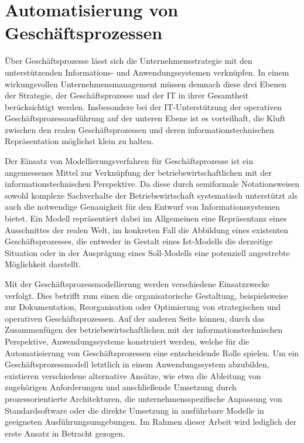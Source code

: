 \section{Automatisierung von Geschäftsprozessen}\label{sec:Automatisierung}
Über Geschäftsprozesse lässt sich die Unternehmensstrategie mit den unterstützenden Informations- und Anwendungssystemen verknüpfen.
In einem wirkungsvollen Unternehmensmanagement müssen demnach diese drei Ebenen der Strategie, der Geschäftsprozesse und der IT in ihrer Gesamtheit berücksichtigt werden.
Insbesondere bei der IT-Unterstützung der operativen Geschäftsprozessausführung auf der unteren Ebene ist es vorteilhaft, die Kluft zwischen den realen Geschäftsprozessen und deren informationstechnischen Repräsentation möglichst klein zu halten.

Der Einsatz von Modellierungsverfahren für Geschäftsprozesse ist ein angemessenes Mittel zur Verknüpfung der betriebswirtschaftlichen mit der informationstechnischen Perspektive.
Da diese durch semiformale Notationsweisen sowohl komplexe Sachverhalte der Betriebswirtschaft systematisch unterstützt als auch die notwendige Genauigkeit für den Entwurf von Informationssystemen bietet.
Ein Modell repräsentiert dabei im Allgemeinen eine Repräsentanz eines Ausschnittes der realen Welt, im konkreten Fall die Abbildung eines existenten Geschäftsprozesses, die entweder in Gestalt eines Ist-Modells die derzeitige Situation oder in der Ausprägung eines Soll-Modells eine potenziell angestrebte Möglichkeit darstellt.

Mit der Geschäftsprozessmodellierung werden verschiedene Einsatzzwecke verfolgt.
Dies betrifft zum einen die organisatorische Gestaltung, beispielsweise zur Dokumentation, Reorganisation oder Optimierung von strategischen und operativen Geschäftsprozessen. 
Auf der anderen Seite können, durch das Zusammenfügen der betriebswirtschaftlichen mit der informationstechnischen Perspektive, Anwendungssysteme konstruiert werden, welche für die Automatisierung von Geschäftsprozessen eine entscheidende Rolle spielen.
Um ein Geschäftsprozessmodell letztlich in einem Anwendungssystem abzubilden, existieren verschiedene alternative Ansätze, wie etwa die Ableitung von zugehörigen Anforderungen und anschließende Umsetzung durch prozessorientierte Architekturen, die unternehmensspezifische Anpassung von Standardsoftware oder die direkte Umsetzung in ausführbare Modelle in geeigneten Ausführungsumgebungen.
Im Rahmen dieser Arbeit wird lediglich der erste Ansatz in Betracht gezogen.

